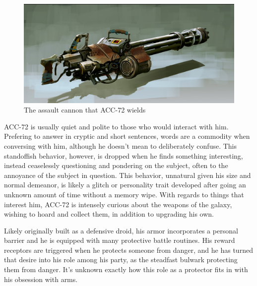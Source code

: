 \documentclass[12pt]{article}
\begin{document}
\begin{figure}[!htb]
  \centering
  \includegraphics[width=.75\textwidth]{./resources/assaultcannon}
  \caption{The assault cannon that ACC-72 wields}
\end{figure}

ACC-72 is usually quiet and polite to those who would interact with him.
Prefering to answer in cryptic and short sentences, words are a commodity when
conversing with him, although he doesn't mean to deliberately confuse. 
This standoffish behavior, however, is dropped when he finds something
interesting, instead ceaselessly questioning and pondering on the subject, often
to the annoyance of the subject in question. 
This behavior, unnatural given his size and normal demeanor, is likely a glitch
or personality trait developed after going an unknown amount of time without
a memory wipe. 
With regards to things that interest him, ACC-72 is intensely curious about the
weapons of the galaxy, wishing to hoard and collect them, in addition to
upgrading his own.

Likely originally built as a defensive droid, his armor incorporates a personal
barrier and he is equipped with many protective battle routines. 
His reward receptors are triggered when he protects someone from danger, and he
has turned that desire into his role among his party, as the steadfast bulwark
protecting them from danger. 
It's unknown exactly how this role as a protector fits in with his obsession
with arms.
\end{document}
